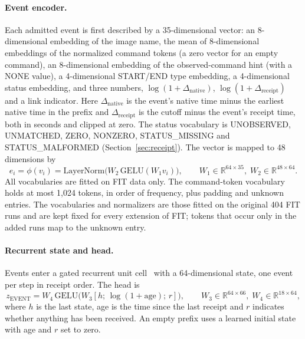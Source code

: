 \paragraph{Event encoder.} Each admitted event is first described by a
35-dimensional vector: an 8-dimensional embedding of the image name,
the mean of 8-dimensional embeddings of the normalized command tokens
(a zero vector for an empty command), an 8-dimensional embedding of the
observed-command hint (with a NONE value), a 4-dimensional START/END
type embedding, a 4-dimensional status embedding, and three numbers,
$\log(1+\Delta_{\mathrm{native}})$, $\log(1+\Delta_{\mathrm{receipt}})$
and a link indicator. Here $\Delta_{\mathrm{native}}$ is the event's
native time minus the earliest native time in the prefix and
$\Delta_{\mathrm{receipt}}$ is the cutoff minus the event's receipt
time, both in seconds and clipped at zero. The status vocabulary is
UNOBSERVED, UNMATCHED, ZERO, NONZERO, STATUS\_MISSING and
STATUS\_MALFORMED (Section~\ref{sec:receipt}). The vector is mapped to
48 dimensions by
\begin{equation}
  e_i=\phi(v_i)=\mathrm{LayerNorm}\bigl(W_2\,\mathrm{GELU}(W_1 v_i)\bigr),
  \qquad W_1\in\mathbb{R}^{64\times 35},\; W_2\in\mathbb{R}^{48\times 64}.
  \label{eq:event-enc}
\end{equation}
All vocabularies are fitted on FIT data only. The command-token
vocabulary holds at most 1,024 tokens, in order of frequency, plus
padding and unknown entries.
The vocabularies and normalizers are those
fitted on the original 404 FIT runs and are kept fixed for every
extension of FIT; tokens that occur only in the added runs map to the
unknown entry.

\paragraph{Recurrent state and head.} Events enter a gated recurrent
unit cell~\cite{cho2014gru} with a 64-dimensional state, one event per
step in receipt order.
 The head is
\begin{equation}
  z_{\mathrm{EVENT}}=W_4\,\mathrm{GELU}\bigl(W_3[h;\,\log(1+\mathrm{age});\,r]\bigr),
  \qquad W_3\in\mathbb{R}^{64\times 66},\; W_4\in\mathbb{R}^{18\times 64},
  \label{eq:head}
\end{equation}
where $h$ is the last state, age is the time since the last receipt and
$r$ indicates whether anything has been received. An empty prefix uses a
learned initial state with age and $r$ set to zero.

